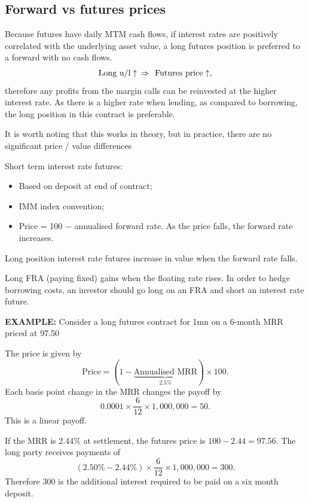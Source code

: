 \documentclass[../notes_compiled.tex]{subfiles}
\begin{document}
\subsection{Forward vs futures prices}
\begin{itemize}
\item Because futures have daily MTM cash flows, if interest rates are positively correlated with the underlying asset value, a long futures position is preferred to a forward with no cash flows.
\begin{equation*}
\text{Long u/l}\uparrow\hspace{0.15cm} \Rightarrow \hspace{0.15cm} \text{Futures price} \uparrow, 
\end{equation*}
therefore any profits from the margin calls can be reinvested at the higher interest rate. As there is a higher rate when lending, as compared to borrowing, the long position in this contract is preferable. 
\item It is worth noting that this works in theory, but in practice, there are no significant price / value differences
\item Short term interest rate futures:
\begin{itemize}
\item Based on deposit at end of contract;
\item IMM index convention;
\item Price = 100 $-$ annualised forward rate. As the price falls, the forward rate increases.
\end{itemize}
\item Long position interest rate futures increase in value when the forward rate falls.
\item Long FRA (paying fixed) gains when the floating rate rises. In order to hedge borrowing costs, an investor should go long on an FRA and short an interest rate future.
{\color{RedViolet}
\item[] \textbf{EXAMPLE:} Consider a long futures contract for 1mn on a 6-month MRR priced at 97.50
}
{\color{RoyalBlue}
\item[] The price is given by
\begin{equation*}
\text{Price} = (1 - \underbrace{\text{Annualised MRR}}_{2.5\%}) \times 100.
\end{equation*}
Each basis point change in the MRR changes the payoff by
\begin{equation*}
0.0001 \times \frac{6}{12} \times 1,000,000 = 50.
\end{equation*}
This is a linear payoff.
\item[] If the MRR is 2.44\% at settlement, the futures price is $100-2.44=97.56$. The long party receives payments of \begin{equation*}
(2.50\% - 2.44\%) \times \frac{6}{12} \times 1,000,000 = 300.
\end{equation*}
Therefore 300 is the additional interest required to be paid on a six month deposit.

}
\end{itemize}
\end{document}
